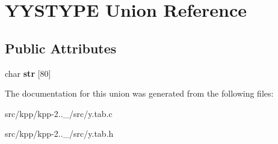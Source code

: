 \hypertarget{unionYYSTYPE}{}\section{Y\+Y\+S\+T\+Y\+PE Union Reference}
\label{unionYYSTYPE}
\subsection*{Public Attributes}
\begin{DoxyCompactItemize}
\item 
\mbox{\label{unionYYSTYPE_a936b902eda9786094744a3ee24e5d95c}} 
char {\bfseries str} \mbox{[}80\mbox{]}
\end{DoxyCompactItemize}


The documentation for this union was generated from the following files\+:\begin{DoxyCompactItemize}
\item 
src/kpp/kpp-\/2..\+\_/src/y.\+tab.\+c\item 
src/kpp/kpp-\/2..\+\_/src/y.\+tab.\+h\end{DoxyCompactItemize}
